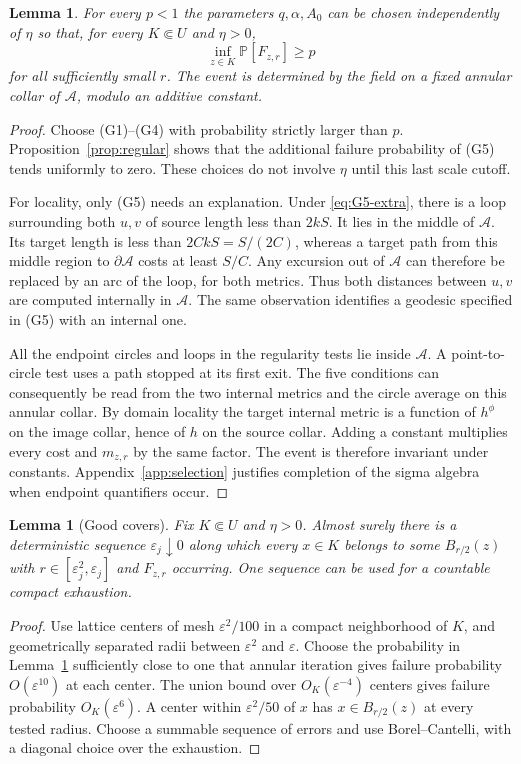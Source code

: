 \documentclass[11pt]{article}
\newtheorem{lemma}[theorem]{Lemma}
\theoremstyle{definition}
\theoremstyle{remark}
\newcommand{\Pp}{\mathbb P}
\newcommand{\eps}{\varepsilon}
\begin{document}
\begin{lemma}\label{lem:good}
For every $p<1$ the parameters $q,\alpha,A_0$ can be chosen
independently of $\eta$ so that, for every $K\Subset U$ and
$\eta>0$,
\[
              \inf_{z\in K}\Pp[F_{z,r}]\ge p
\]
for all sufficiently small $r$. The event is determined by the
field on a fixed annular collar of $\mathcal A$, modulo an
additive constant.
\end{lemma}
\begin{proof}
Choose (G1)--(G4) with probability strictly larger than $p$.
Proposition~\ref{prop:regular} shows that the additional failure
probability of (G5) tends uniformly to zero. These choices do
not involve $\eta$ until this last scale cutoff.

For locality, only (G5) needs an explanation. Under
\eqref{eq:G5-extra}, there is a loop surrounding both $u,v$ of
source length less than $2kS$. It lies in the middle of
$\mathcal A$. Its target length is less than
$2CkS=S/(2C)$, whereas a target path from this middle region
to $\partial\mathcal A$ costs at least $S/C$. Any excursion
out of $\mathcal A$ can therefore be replaced by an arc of the
loop, for both metrics. Thus both distances between $u,v$ are
computed internally in $\mathcal A$. The same observation
identifies a geodesic specified in (G5) with an internal one.

All the endpoint circles and loops in the regularity tests lie
inside $\mathcal A$. A point-to-circle test uses a path stopped
at its first exit. The five conditions can consequently be
read from the two internal metrics and the circle average on
this annular collar. By domain locality the target internal
metric is a function of $h^\phi$ on the image collar, hence of
$h$ on the source collar. Adding a constant multiplies every
cost and $m_{z,r}$ by the same factor. The event is therefore
invariant under constants. Appendix~\ref{app:selection}
justifies completion of the sigma algebra when endpoint
quantifiers occur.
\end{proof}

\begin{lemma}[Good covers]\label{lem:covers}
Fix $K\Subset U$ and $\eta>0$. Almost surely there is a
deterministic sequence $\eps_j\downarrow0$ along which every
$x\in K$ belongs to some $B_{r/2}(z)$ with
$r\in[\eps_j^2,\eps_j]$ and $F_{z,r}$ occurring.
One sequence can be used for a countable compact exhaustion.
\end{lemma}
\begin{proof}
Use lattice centers of mesh $\eps^2/100$ in a compact
neighborhood of $K$, and geometrically separated radii between
$\eps^2$ and $\eps$. Choose the probability in
Lemma~\ref{lem:good} sufficiently close to one that annular
iteration gives failure probability $O(\eps^{10})$ at each
center. The union bound over $O_K(\eps^{-4})$ centers gives
failure probability $O_K(\eps^6)$. A center within
$\eps^2/50$ of $x$ has $x\in B_{r/2}(z)$ at every tested
radius. Choose a summable sequence of errors and use
Borel--Cantelli, with a diagonal choice over the exhaustion.
\end{proof}
\end{document}
